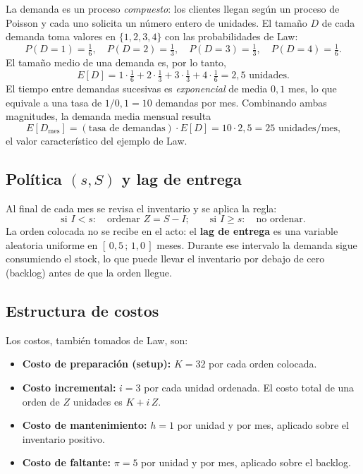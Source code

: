 \documentclass[11pt]{article}
\begin{document}
La demanda es un proceso \emph{compuesto}: los clientes llegan seg\'un un
proceso de Poisson y cada uno solicita un n\'umero entero de unidades. El
tama\~no $D$ de cada demanda toma valores en $\{1, 2, 3, 4\}$ con las
probabilidades de Law:
\begin{equation}
P(D = 1) = \tfrac{1}{6}, \quad
P(D = 2) = \tfrac{1}{3}, \quad
P(D = 3) = \tfrac{1}{3}, \quad
P(D = 4) = \tfrac{1}{6}.
\end{equation}
El tama\~no medio de una demanda es, por lo tanto,
\begin{equation}
E[D] = 1\cdot\tfrac{1}{6} + 2\cdot\tfrac{1}{3} + 3\cdot\tfrac{1}{3}
       + 4\cdot\tfrac{1}{6} = 2{,}5 \text{ unidades.}
\end{equation}
El tiempo entre demandas sucesivas es \emph{exponencial} de media $0{,}1$ mes,
lo que equivale a una tasa de $1 / 0{,}1 = 10$ demandas por mes. Combinando
ambas magnitudes, la demanda media mensual resulta
\begin{equation}
E[D_{\text{mes}}] = (\text{tasa de demandas}) \cdot E[D]
                  = 10 \cdot 2{,}5 = 25 \text{ unidades/mes,}
\label{eq:demanda-media}
\end{equation}
el valor caracter\'istico del ejemplo de Law.

\subsection{Pol\'itica $(s, S)$ y lag de entrega}

Al final de cada mes se revisa el inventario y se aplica la regla:
\begin{equation}
\text{si } I < s: \quad \text{ordenar } Z = S - I; \qquad
\text{si } I \ge s: \quad \text{no ordenar.}
\end{equation}
La orden colocada no se recibe en el acto: el \textbf{lag de entrega} es una
variable aleatoria uniforme en $[\,0{,}5\,;\,1{,}0\,]$ meses. Durante ese
intervalo la demanda sigue consumiendo el stock, lo que puede llevar el
inventario por debajo de cero (backlog) antes de que la orden llegue.

\subsection{Estructura de costos}

Los costos, tambi\'en tomados de Law, son:
\begin{itemize}
  \item \textbf{Costo de preparaci\'on (setup):} $K = 32$ por cada orden
    colocada.
  \item \textbf{Costo incremental:} $i = 3$ por cada unidad ordenada. El costo
    total de una orden de $Z$ unidades es $K + i\,Z$.
  \item \textbf{Costo de mantenimiento:} $h = 1$ por unidad y por mes, aplicado
    sobre el inventario positivo.
  \item \textbf{Costo de faltante:} $\pi = 5$ por unidad y por mes, aplicado
    sobre el backlog.
\end{itemize}
\end{document}
